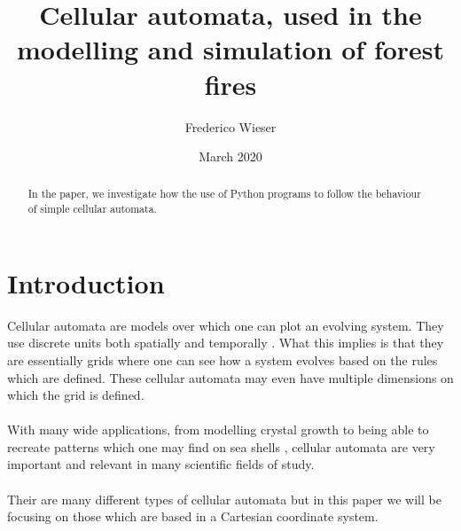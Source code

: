 \documentclass{article}
\title{Cellular automata, used in the modelling and simulation of forest fires}
\author{Frederico Wieser}
\date{March 2020}
\begin{document}
\maketitle
\begin{abstract}
In the paper, we investigate how the use of Python programs to follow the behaviour of simple cellular automata.
\end{abstract}

\section{Introduction}
Cellular automata are models over which one can plot an evolving system. They use discrete units both spatially and temporally \cite{proj}. What this implies is that they are essentially grids where one can see how a system evolves based on the rules which are defined. These cellular automata may even have multiple dimensions on which the grid is defined.\\
\\
With many wide applications, from modelling crystal growth to being able to recreate patterns which one may find on sea shells \cite{proj}, cellular automata are very important and relevant in many scientific fields of study.\\
\\
Their are many different types of cellular automata but in this paper we will be focusing on those which are based in a Cartesian coordinate system.
\end{document}
